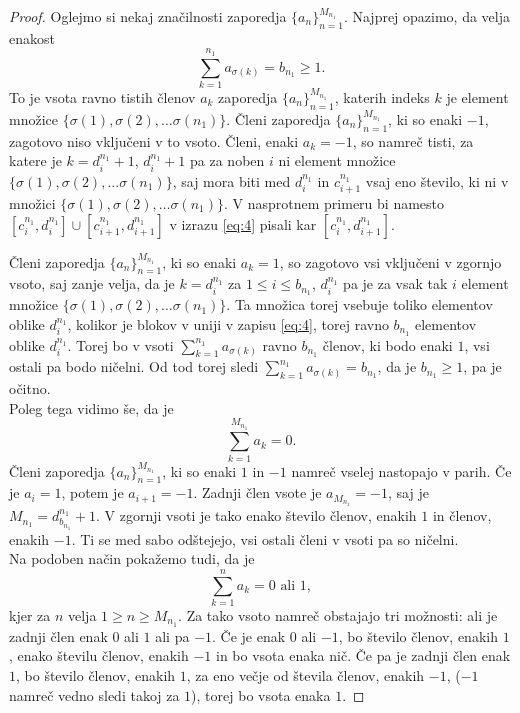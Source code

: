 \documentclass[12pt,a4paper,reqno]{amsart}
\theoremstyle{definition} %
\theoremstyle{plain} %
\begin{document}
\begin{proof}
Oglejmo si nekaj značilnosti zaporedja $\{a_n\}^{M_{n_1}}_{n=1}$. 
Najprej opazimo, da velja enakost $$\sum_{k=1}^{n_1}a_{\sigma(k)}=b_{n_1}\geq 1.$$ To je vsota ravno tistih členov $a_k$ zaporedja $\{a_n\}^{M_{n_1}}_{n=1}$, katerih indeks $k$ je element množice $\{ \sigma (1), \sigma (2), \ldots \sigma (n_1) \}$. Členi zaporedja $\{a_n\}^{M_{n_1}}_{n=1}$, ki so enaki $-1$, zagotovo niso vključeni v to vsoto. Členi, enaki $a_k=-1$, so namreč tisti, za katere je $k=d_i^{n_1}+1$, $d_i^{n_1}+1$ pa za noben $i$ ni element množice $\{ \sigma (1), \sigma (2), \ldots \sigma (n_1) \}$, saj mora biti med $d_i^{n_1}$ in $c_{i+1}^{n_1}$ vsaj eno število, ki ni v množici $\{ \sigma (1), \sigma (2), \ldots \sigma (n_1) \}$. V nasprotnem primeru bi namesto $[c_i^{n_1},d_i^{n_1}] \cup [c_{i+1}^{n_1},d_{i+1}^{n_1}]$ v izrazu \eqref{eq:4} pisali kar $[c_i^{n_1},d_{i+1}^{n_1}]$. 

Členi zaporedja $\{a_n\}^{M_{n_1}}_{n=1}$, ki so enaki $a_k=1$, so zagotovo vsi vključeni v zgornjo vsoto, saj zanje velja, da je $k=d_i^{n_1}$ za $1\leq i\leq b_{n_1}$, $d_i^{n_1}$ pa je za vsak tak $i$ element množice $\{ \sigma (1), \sigma (2), \ldots \sigma (n_1) \}$. Ta množica torej vsebuje toliko elementov oblike $d_i^{n_1}$, kolikor je blokov v uniji v zapisu \eqref{eq:4}, torej ravno $b_{n_1}$ elementov oblike $d_i^{n_1}$. Torej bo v vsoti $\sum_{k=1}^{n_1}a_{\sigma(k)}$ ravno $b_{n_1}$ členov, ki bodo enaki $1$, vsi ostali pa bodo ničelni. Od tod torej sledi $\sum_{k=1}^{n_1}a_{\sigma(k)}=b_{n_1}$, da je $b_{n_1}\geq 1$, pa je očitno.\\

Poleg tega vidimo še, da je $$\sum_{k=1}^{M_{n_1}}a_k=0.$$ Členi zaporedja $\{a_n\}^{M_{n_1}}_{n=1}$, ki so enaki $1$ in $-1$ namreč vselej nastopajo v parih. Če je $a_i=1$, potem je $a_{i+1}=-1$. Zadnji člen vsote je $a_{M_{n_1}}=-1$, saj je $M_{n_1}=d_{b_{n_1}}^{n_1}+1$. V zgornji vsoti je tako enako število členov, enakih $1$ in členov, enakih $-1$. Ti se med sabo odštejejo, vsi ostali členi v vsoti pa so ničelni.\\

Na podoben način pokažemo tudi, da je $$\sum_{k=1}^{n}a_k=0\textrm{ ali }1,$$ kjer za $n$ velja $1\geq n\geq M_{n_1}$. Za tako vsoto namreč obstajajo tri možnosti: ali je zadnji člen enak $0$ ali $1$ ali pa $-1$. Če je enak $0$ ali $-1$, bo število členov, enakih $1$, enako številu členov, enakih $-1$ in bo vsota enaka nič. Če pa je zadnji člen enak $1$, bo število členov, enakih $1$, za eno večje od števila členov, enakih $-1$, ($-1$ namreč vedno sledi takoj za $1$), torej bo vsota enaka $1$.


\end{proof}
\end{document}

